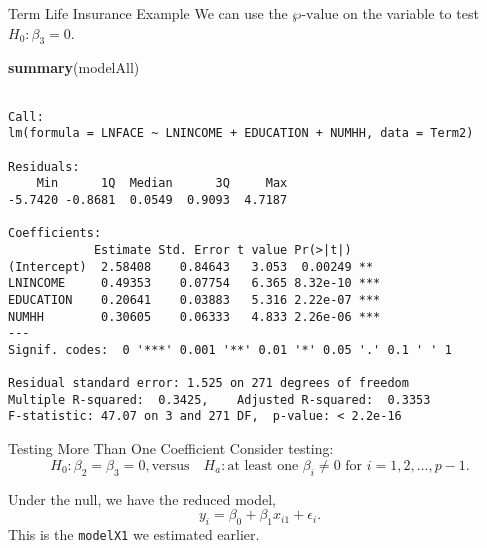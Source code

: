 \documentclass[
  ignorenonframetext,
]{beamer}
\newenvironment{Shaded}{\begin{snugshade}}{\end{snugshade}}
\newcommand{\FunctionTok}[1]{\textcolor[rgb]{0.13,0.29,0.53}{\textbf{#1}}}
\newcommand{\NormalTok}[1]{#1}
\begin{document}
\begin{frame}[fragile]{Term Life Insurance Example}
\protect\hypertarget{term-life-insurance-example-3}{}
We can use the \(\wp\text{-value}\) on the variable to test
\(H_0:\beta_3=0\).

\scriptsize

\begin{Shaded}
\begin{Highlighting}[]
\FunctionTok{summary}\NormalTok{(modelAll)}
\end{Highlighting}
\end{Shaded}

\begin{verbatim}

Call:
lm(formula = LNFACE ~ LNINCOME + EDUCATION + NUMHH, data = Term2)

Residuals:
    Min      1Q  Median      3Q     Max 
-5.7420 -0.8681  0.0549  0.9093  4.7187 

Coefficients:
            Estimate Std. Error t value Pr(>|t|)    
(Intercept)  2.58408    0.84643   3.053  0.00249 ** 
LNINCOME     0.49353    0.07754   6.365 8.32e-10 ***
EDUCATION    0.20641    0.03883   5.316 2.22e-07 ***
NUMHH        0.30605    0.06333   4.833 2.26e-06 ***
---
Signif. codes:  0 '***' 0.001 '**' 0.01 '*' 0.05 '.' 0.1 ' ' 1

Residual standard error: 1.525 on 271 degrees of freedom
Multiple R-squared:  0.3425,    Adjusted R-squared:  0.3353 
F-statistic: 47.07 on 3 and 271 DF,  p-value: < 2.2e-16
\end{verbatim}

\normalsize
\end{frame}

\begin{frame}[fragile]{Testing More Than One Coefficient}
\protect\hypertarget{testing-more-than-one-coefficient}{}
Consider testing:
\[H_0:\beta_2=\beta_3=0, \text{versus} \quad H_a: \text{at least one } \beta_i \neq 0 \text{ for } i = 1, 2, \ldots, p-1.\]

Under the null, we have the reduced model,
\[y_i=\beta_0+\beta_1 x_{i1}+\epsilon_i.\] This is the \texttt{modelX1}
we estimated earlier.
\end{frame}
\end{document}
